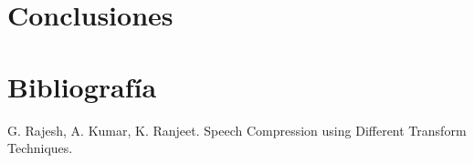 \documentclass[a4paper,11pt]{article}
\begin{document}
\section{Conclusiones}
\newpage
\section{Bibliograf\'ia}
G. Rajesh, A. Kumar, K. Ranjeet. Speech Compression using Different Transform Techniques.
\end{document}
